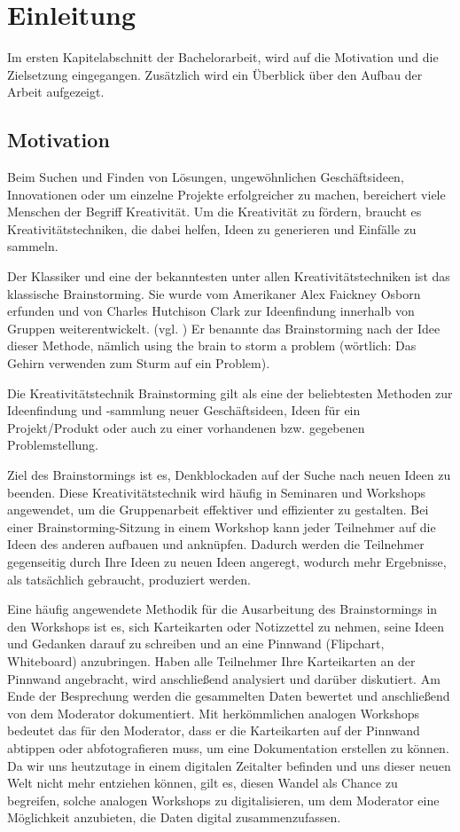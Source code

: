 \chapter{Einleitung}
\label{sec:einleitung}
Im ersten Kapitelabschnitt der Bachelorarbeit, wird auf die Motivation und die Zielsetzung eingegangen. Zusätzlich wird ein Überblick über den Aufbau der Arbeit aufgezeigt.

\section{Motivation}
\label{sec:motivation}
Beim Suchen und Finden von Lösungen, ungewöhnlichen Geschäftsideen, Innovationen oder um einzelne Projekte erfolgreicher zu machen, bereichert viele Menschen der Begriff Kreativität. Um die Kreativität zu fördern, braucht es Kreativitätstechniken, die dabei helfen, Ideen zu generieren und Einfälle zu sammeln.\bigskip

Der Klassiker und eine der bekanntesten unter allen Kreativitätstechniken ist das klassische Brainstorming. Sie wurde vom Amerikaner Alex Faickney Osborn erfunden und von Charles Hutchison Clark zur Ideenfindung innerhalb von Gruppen weiterentwickelt. 
(vgl. \cite{Ben.o.J.}) \glqq Er benannte das Brainstorming nach der Idee dieser Methode, nämlich using the brain to storm a problem (wörtlich: Das Gehirn verwenden zum Sturm auf ein Problem).\grqq{} \cite{Pas2012}\bigskip

Die Kreativitätstechnik Brainstorming gilt als eine der beliebtesten Methoden zur Ideenfindung und -sammlung neuer Geschäftsideen, Ideen für ein Projekt/Produkt oder auch zu einer vorhandenen bzw. gegebenen Problemstellung.\bigskip

Ziel des Brainstormings ist es, Denkblockaden auf der Suche nach neuen Ideen zu beenden. Diese Kreativitätstechnik wird häufig in Seminaren und Workshops angewendet, um die Gruppenarbeit effektiver und effizienter zu gestalten. Bei einer Brainstorming-Sitzung in einem Workshop kann jeder Teilnehmer auf die Ideen des anderen aufbauen und anknüpfen. Dadurch werden die Teilnehmer gegenseitig durch Ihre Ideen zu neuen Ideen angeregt, wodurch mehr Ergebnisse, als tatsächlich gebraucht, produziert werden.\bigskip

Eine häufig angewendete Methodik für die Ausarbeitung des Brainstormings in den Workshops ist es, sich Karteikarten oder Notizzettel zu nehmen, seine Ideen und Gedanken darauf zu schreiben und an eine Pinnwand (Flipchart, Whiteboard) anzubringen. Haben alle Teilnehmer Ihre Karteikarten an der Pinnwand angebracht, wird anschließend analysiert und darüber diskutiert. Am Ende der Besprechung werden die gesammelten Daten bewertet und anschließend von dem Moderator dokumentiert. Mit herkömmlichen analogen Workshops bedeutet das für den Moderator, dass er die Karteikarten auf der Pinnwand abtippen oder abfotografieren muss, um eine Dokumentation erstellen zu können. Da wir uns heutzutage in einem digitalen Zeitalter befinden und uns dieser neuen Welt nicht mehr entziehen können, gilt es, diesen Wandel als Chance zu begreifen, solche analogen Workshops zu digitalisieren, um dem Moderator eine Möglichkeit anzubieten, die Daten digital zusammenzufassen.

